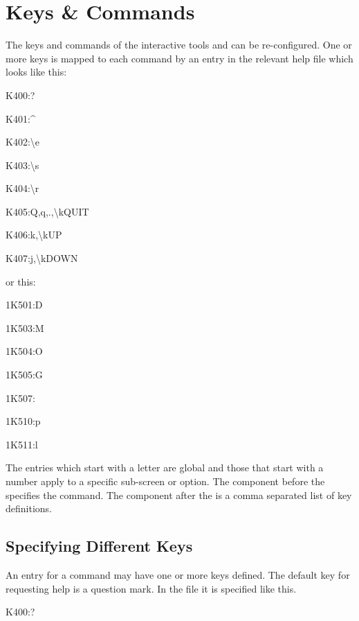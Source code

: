 \section{Keys \& Commands}
The keys and commands of the interactive tools \PrBtq{} and \PrBtuser{} can be
re-configured. One or more keys is mapped to each command by an entry
in the relevant help file which looks like this:

\begin{expara}

K400:?

K401:\^{}

K402:{\textbackslash}e

K403:{\textbackslash}s

K404:{\textbackslash}r

K405:Q,q,.,{\textbackslash}kQUIT

K406:k,{\textbackslash}kUP

K407:j,{\textbackslash}kDOWN

\end{expara}

or this:

\begin{expara}

1K501:D

1K503:M

1K504:O

1K505:G

1K507:{\textquotedbl}

1K510:p

1K511:l

\end{expara}

The entries which start with a letter  are
global and those that start with a number apply to a specific
sub-screen or option. The component before the \exampletext{:}
specifies the command. The component after the \exampletext{:}
is a comma separated list of key definitions.

\subsection{Specifying Different Keys}
An entry for a command may have one or more keys defined. The default
key for requesting help is a question mark. In the
 file it is specified like this.

\begin{expara}

K400:?

\end{expara}

